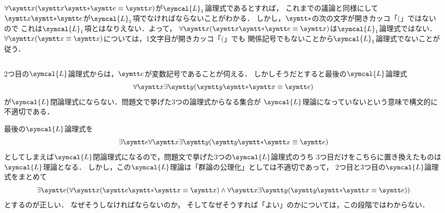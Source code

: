 \(\apply{\forall \obj{x}}{\obj{x} \obj{\ast} \obj{e} \objeq \obj{x}}\)が\(\symcal{L}_1\)論理式であるとすれば，
これまでの議論と同様にして\(\obj{x} \obj{\ast} \obj{e}\)が\(\symcal{L}_1\)項でなければならないことがわかる．
しかし，\(\obj{\ast}\)の次の文字が開きカッコ「\(\lparen\)」ではないので
これは\(\symcal{L}_1\)項とはなりえない．よって，
\(\apply{\forall \obj{x}}{\obj{x} \obj{\ast} \obj{e} \objeq \obj{x}}\)は\(\symcal{L}_1\)論理式ではない．
\(\apply{\forall \obj{x}}{\obj{x} \objeq \obj{x}}\)については，1文字目が開きカッコ「\(\lparen\)」でも
関係記号でもないことから\(\symcal{L}_1\)論理式でないことが従う．

\subsection*{}

2つ目の\(\symcal{L}\)論理式からは，\(\obj{e}\)が変数記号であることが伺える．
しかしそうだとすると最後の\(\symcal{L}\)論理式
\[
	\forall \obj{x} \exists \obj{y} \paren{\obj{y} \obj{\ast} \obj{x} \objeq \obj{e}}
\]
が\(\symcal{L}\)閉論理式にならない．問題文で挙げた3つの論理式からなる集合が
\(\symcal{L}\)理論になっていないという意味で構文的に不適切である．

最後の\(\symcal{L}\)論理式を
\[
	\exists \obj{e} \forall \obj{x} \exists \obj{y} \paren{\obj{y} \obj{\ast} \obj{x} \objeq \obj{e}}
\]
としてしまえば\(\symcal{L}\)閉論理式になるので，問題文で挙げた3つの\(\symcal{L}\)論理式のうち
3つ目だけをこちらに置き換えたものは\(\symcal{L}\)理論となる．
しかし，この\(\symcal{L}\)理論は「群論の公理化」としては不適切であって，
2つ目と3つ目の\(\symcal{L}\)論理式をまとめて
\[
	\exists \obj{e} \paren{
		\forall \obj{x} \paren{\obj{e} \obj{\ast} \obj{x} \objeq \obj{x}}
		\land \forall \obj{x} \exists \obj{y} \paren{\obj{y} \obj{\ast} \obj{x} \objeq \obj{e}}
	}
\]
とするのが正しい．
なぜそうしなければならないのか，
そしてなぜそうすれば「よい」のかについては，この段階ではわからない．

\subsection*{}

